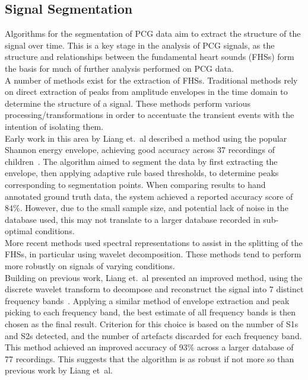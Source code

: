 \documentclass[titlepage, 12pt]{scrartcl} \usepackage{enumitem}
\begin{document}
\subsection{Signal Segmentation}\label{Segmentation}
Algorithms for the segmentation of PCG data aim to  extract the structure of
the signal over time. This is a key stage in the analysis of PCG signals, as the
structure and relationships between the fundamental heart sounds (FHSs) form
the basis for much of further analysis performed on PCG data.\\


A number of methods exist for the extraction of FHSs. Traditional methods rely
on direct extraction of peaks from amplitude envelopes in the time domain to
determine the structure of a signal.  These methods perform various
processing/transformations in order to accentuate the transient events with the
intention of isolating them.\\
Early work in this area by Liang et.\ al described a method using the popular
Shannon energy envelope, achieving good accuracy across 37 recordings of
children~\parencite{Liang1997b}. The algorithm aimed to segment the data by
first extracting the envelope, then applying adaptive rule based thresholds, to
determine peaks corresponding to segmentation points. When comparing results to
hand annotated ground truth data, the system achieved a reported accuracy score
of 84\%. However, due to the small sample size, and potential lack of noise in
the database used, this may not translate to a larger database recorded in
sub-optimal conditions.\\
More recent methods used spectral representations to assist in the splitting of
the FHSs, in particular using wavelet decomposition. These methods tend to
perform more robustly on signals of varying conditions.\\
Building on previous work, Liang et.\ al presented an improved method, using the
discrete wavelet transform to decompose and reconstruct the signal into 7
distinct frequency bands~\parencite{Liang1997a}. Applying a similar method
of envelope extraction and peak picking to each frequency band, the best
estimate of all frequency bands is then chosen as the final result. Criterion
for this choice is based on the number of S1s and S2s detected, and the number
of artefacts discarded for each frequency band. This method achieved an
improved accuracy of 93\% across a larger database of 77 recordings. This
suggests that the algorithm is as robust if not more so than previous work by
Liang et\ al.\\
\end{document}
